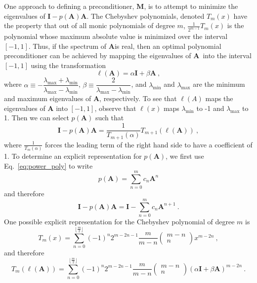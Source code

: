 \documentclass[10pt]{article}
\newcommand{\bA}{\ensuremath{\mathbf{A}}}
\newcommand{\bM}{\ensuremath{\mathbf{M}}}
\newcommand{\bI}{\ensuremath{\mathbf{I}}}
\begin{document}
One approach to defining a preconditioner, $\bM$, is to
attempt to minimize the eigenvalues of $\bI - p(\bA) \bA$.
The Chebyshev polynomials, denoted $T_m(x)$ have the property
that out of all monic polynomials of degree $m$,
$\frac{1}{2^{m-1}} T_m(x)$ is the polynomial whose maximum
absolute value is minimized over the interval $[-1,1]$.
Thus, if the spectrum of \bA is real, then an optimal polynomial
preconditioner can be achieved by mapping the eigenvalues of
\bA\ into the interval $[-1,1]$ using the transformation
\begin{equation}
\ell (\bA) = \alpha \bI + \beta \bA \:,
\end{equation}
where $\alpha  \equiv -\dfrac{\lambda_\text{max} + \lambda_\text{min}}
{\lambda_\text{max} -  \lambda_\text{min}}$,
$\beta \equiv \dfrac{2}{\lambda_\text{max} -  \lambda_\text{min}}$,
and $\lambda_\text{min}$ and $\lambda_\text{max}$ are the
minimum and maximum eigenvalues of $\bA$, respectively.
To see that $\ell(A)$ maps the eigenvalues of $\bA$ into $[-1,1]$,
observe that $\ell(x)$ maps $\lambda_\text{min}$ to -1 and
$\lambda_\text{max}$ to 1.
Then we can select $p(\bA)$ such that
\begin{equation}
\bI - p(\bA) \bA  = \frac{1}{T_{m+1}(\alpha)}
T_{m+1} \left( \ell(\bA) \right) \:, \label{eq:cheby_prec}
\end{equation}
where $\frac{1}{T_m ( \alpha )}$ forces the leading
term of the right hand side to have a coefficient of 1.
To determine an explicit representation for $p(\bA)$, we first
use Eq.~\eqref{eq:power_poly} to write
\begin{equation}
p(\bA) = \sum_{n=0}^{m} c_n \bA^n
\end{equation}
and therefore
\begin{equation}
\bI - p(\bA) \bA = \bI - \sum_{n=0}^{m} c_n \bA^{n+1} \:. \label{eq:poly_prec}
\end{equation}
One possible explicit representation for the Chebyshev polynomial of degree $m$ is
\begin{equation}
T_m(x) = \sum_{n=0}^{\lfloor \frac{m}{2} \rfloor} \left( -1 \right)^n 2^{m - 2n -1} \frac{m}{m-n}
\begin{pmatrix} m-n \\ n \end{pmatrix} x^{m-2n} \:,
\end{equation}
and therefore
\begin{equation}
T_m \left( \ell(\bA) \right) = \sum_{n=0}^{\lfloor \frac{m}{2} \rfloor} \left( -1 \right)^n 2^{m - 2n -1} \frac{m}{m-n}
\begin{pmatrix} m-n \\ n \end{pmatrix} \left( \alpha \bI + \beta \bA \right)^{m-2n} \:.
\end{equation}
\end{document}
